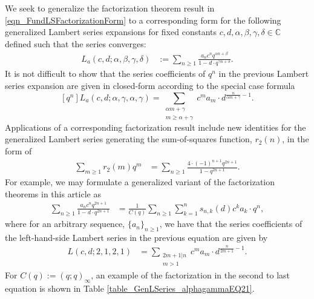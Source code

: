 \documentclass[10pt,reqno]{amsart}
\numberwithin{figure}{section}
\numberwithin{table}{section}
\theoremstyle{plain}
\numberwithin{theorem}{section}
\theoremstyle{remark}
\begin{document}
We seek to generalize the factorization theorem result in 
\eqref{eqn_FundLSFactorizationForm} to a corresponding form 
for the following generalized Lambert series expansions for fixed constants 
$c, d, \alpha, \beta, \gamma, \delta \in \mathbb{C}$ defined such that the series converges: 
\begin{align} 
\label{eqn_GenLambertSeries_LacdAlphaBetaGammaDelta_exp_v1} 
L_a(c, d; \alpha, \beta, \gamma, \delta) & := 
     \sum_{n \geq 1} \frac{a_n c^n q^{\alpha n+\beta}}{1-d \cdot q^{\gamma n+\delta}}. 
\end{align} 
It is not difficult to show that the series coefficients of $q^n$ in the previous Lambert series 
expansion are given in closed-form according to the special case formula 
\[
[q^n] L_a(c, d; \alpha, \gamma, \alpha, \gamma) = 
     \sum_{\substack{\alpha m+\gamma \\ m \geq \alpha+\gamma}} c^m a_m \cdot d^{\frac{n}{\alpha m+\gamma}-1}. 
\]
Applications of a corresponding factorization result include new identities for the generalized 
Lambert series generating the sum-of-squares function, $r_2(n)$, in the form of 
\cite[\S 17.10]{HARDYANDWRIGHT} 
\begin{align*} 
\sum_{m \geq 1} r_2(m) q^m & = \sum_{n \geq 1} \frac{4 \cdot (-1)^{n+1} q^{2n+1}}{1-q^{2n+1}}. 
\end{align*} 
For example, we may formulate a generalized variant of the factorization theorems in this article as 
\begin{align*} 
\sum_{n \geq 1} \frac{a_n c^n q^{2n+1}}{1-d \cdot q^{2n+1}} & = 
     \frac{1}{C(q)} \sum_{n \geq 1} \sum_{k=1}^n s_{n,k}(d) c^k a_k \cdot q^n, 
\end{align*} 
where for an arbitrary sequence, $\{a_n\}_{n \geq 1}$, we have that the series coefficients of the 
left-hand-side Lambert series in the previous equation are given by 
\label{eqn_Lcd2121_factorization_thm}
\begin{align*}
[q^n] L(c, d; 2, 1, 2, 1) & = \sum_{\substack{2m+1|n \\ m>1}} c^m a_m \cdot d^{\frac{n}{2m+1}-1}. 
\end{align*} 
For $C(q) := (q; q)_{\infty}$, an example of the factorization in the second to last equation is 
shown in Table \ref{table_GenLSeries_alphagammaEQ21}. 
\end{document}
